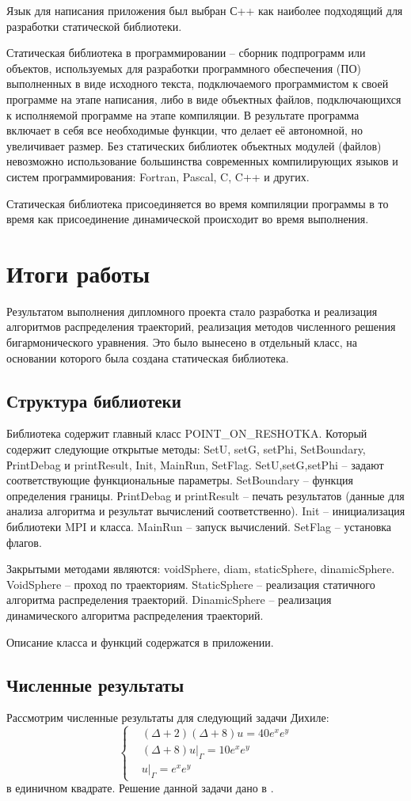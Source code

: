 Язык для написания приложения был выбран С++ как наиболее подходящий для разработки статической библиотеки.

Статическая библиотека в программировании -- сборник подпрограмм или объектов, используемых для разработки программного обеспечения (ПО) выполненных в виде исходного текста, подключаемого программистом к своей программе на этапе написания, либо в виде объектных файлов, подключающихся к исполняемой программе на этапе компиляции. В результате программа включает в себя все необходимые функции, что делает её автономной, но увеличивает размер. Без статических библиотек объектных модулей (файлов) невозможно использование большинства современных компилирующих языков и систем программирования: Fortran, Pascal, C, C++ и других.

Статическая библиотека присоединяется во время компиляции программы в то время как присоединение динамической происходит во время выполнения.

\chapter{Итоги работы}
Результатом выполнения дипломного проекта стало разработка и реализация алгоритмов распределения траекторий, реализация методов численного решения бигармонического уравнения. Это было вынесено в отдельный класс, на основании которого была создана статическая библиотека.  
\section{Структура библиотеки}
Библиотека содержит главный класс POINT\_ON\_RESHOTKA.
Который содержит следующие открытые методы: SetU, setG, setPhi, SetBoundary, РrintDebag и printResult, Init, MainRun, SetFlag.
SetU,setG,setPhi -- задают соответствующие функциональные параметры.
SetBoundary -- функция определения границы.
РrintDebag и printResult -- печать результатов (данные для анализа алгоритма и результат вычислений соответственно).
Init -- инициализация библиотеки MPI и класса.
MainRun -- запуск вычислений.
SetFlag -- установка флагов.

Закрытыми методами являются: voidSphere, diam, staticSphere, dinamicSphere.
VoidSphere -- проход по траекториям.
StaticSphere -- реализация статичного алгоритма распределения траекторий.
DinamicSphere -- реализация динамического алгоритма распределения траекторий.

Описание класса и функций содержатся в приложении.
\section{Численные результаты}
Рассмотрим численные результаты для следующий задачи Дихиле:
\begin{equation} 
	\left\{
\begin{aligned}
& (\Delta + 2) (\Delta +8) u = 40e^{x}e^{y}\\ & (\Delta +8) u|_{\Gamma} = 10e^{x}e^{y}\\&u|_{\Gamma} = e^{x}e^{y}
\end{aligned}
 \right. \end{equation}
{}
в единичном квадрате. Решение данной задачи дано в \cite{luk:dis}.

